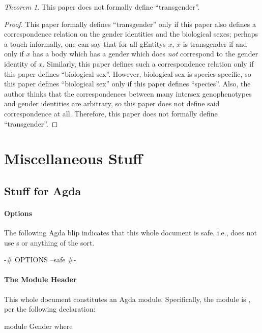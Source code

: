 \documentclass{article}
\theoremstyle{remark}
\newtheorem{theorem}{Theorem}
\begin{document}
\begin{theorem}
  This paper does not formally define ``transgender''.
\end{theorem}
\begin{proof}
  This paper formally defines ``transgender'' only if this paper also defines a correspondence relation on the gender identities and the biological sexes; perhaps a touch informally, one can say that for all \glspl{gEntity} \(x\), \(x\) is transgender if and only if \(x\) has a body which has a gender which does \emph{not} correspond to the gender identity of \(x\).  Similarly, this paper defines such a correspondence relation only if this paper defines ``biological sex''.  However, biological sex is species-specific,\cite{citationNeeded} so this paper defines ``biological sex'' only if this paper defines ``species''.  Also, the author thinks that the correspondences between many intersex genophenotypes and gender identities are arbitrary, so this paper does not define said correspondence at all.  Therefore, this paper does not formally define ``transgender''.
\end{proof}

\section{Miscellaneous Stuff}

\subsection{Stuff for Agda}

\paragraph{Options}
The following Agda blip indicates that this whole document is safe, i.e., does not use s or anything of the sort.

\begin{code}
{-# OPTIONS --safe #-}
\end{code}

\paragraph{The Module Header}
This whole document constitutes an Agda module.  Specifically, the module is , per the following declaration:

\begin{code}
module Gender where
\end{code}
\end{document}
